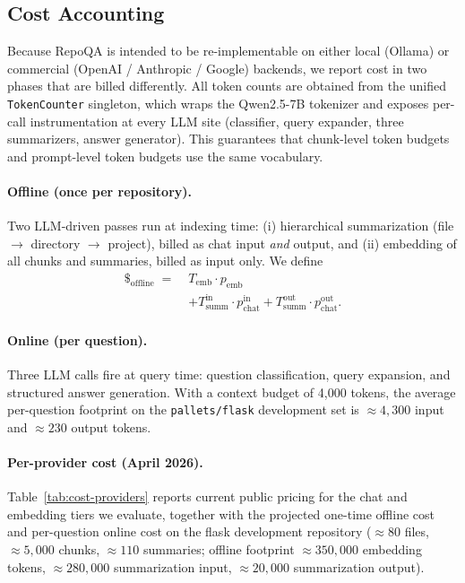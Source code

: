 \documentclass[11pt]{article}
\begin{document}
\subsection{Cost Accounting}
\label{sec:cost}

Because RepoQA is intended to be re-implementable on either local (Ollama) or commercial (OpenAI / Anthropic / Google) backends, we report cost in two phases that are billed differently. All token counts are obtained from the unified \texttt{TokenCounter} singleton, which wraps the Qwen2.5-7B tokenizer and exposes per-call instrumentation at every LLM site (classifier, query expander, three summarizers, answer generator). This guarantees that chunk-level token budgets and prompt-level token budgets use the same vocabulary.

\paragraph{Offline (once per repository).} Two LLM-driven passes run at indexing time: (i) hierarchical summarization (file $\rightarrow$ directory $\rightarrow$ project), billed as chat input \emph{and} output, and (ii) embedding of all chunks and summaries, billed as input only. We define
\begin{align}
\$_{\text{offline}}\;=\;& T_{\text{emb}} \cdot p_{\text{emb}} \nonumber \\
&+ T_{\text{summ}}^{\text{in}}\cdot p_{\text{chat}}^{\text{in}}
+ T_{\text{summ}}^{\text{out}}\cdot p_{\text{chat}}^{\text{out}}.
\end{align}

\paragraph{Online (per question).} Three LLM calls fire at query time: question classification, query expansion, and structured answer generation. With a context budget of 4{,}000 tokens, the average per-question footprint on the \texttt{pallets/flask} development set is $\approx 4{,}300$ input and $\approx 230$ output tokens.

\paragraph{Per-provider cost (April 2026).}
Table~\ref{tab:cost-providers} reports current public pricing for the chat and embedding tiers we evaluate, together with the projected one-time offline cost and per-question online cost on the flask development repository ($\approx 80$ files, $\approx 5{,}000$ chunks, $\approx 110$ summaries; offline footprint $\approx 350{,}000$ embedding tokens, $\approx 280{,}000$ summarization input, $\approx 20{,}000$ summarization output).
\end{document}
